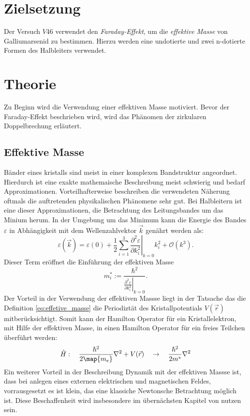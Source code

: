 \setcounter{page}{1}
\section*{Zielsetzung}
Der Versuch $V46$ verwendet den \emph{Faraday-Effekt}, um die \emph{effektive Masse} von
Galliumarsenid zu bestimmen. Hierzu werden eine undotierte und zwei n-dotierte
Formen des Halbleiters verwendet.

\section{Theorie}
Zu Beginn wird die Verwendung einer effektiven Masse motiviert.
Bevor der Faraday-Effekt beschrieben wird, wird das Phänomen der zirkularen
Doppelbrechung erläutert.

\subsection{Effektive Masse}\label{sec:effektive_masse}
 Bänder eines kristalls sind meist in einer komplexen Bandstruktur angeordnet.
Hierdurch ist eine exakte mathemaische Beschreibung meist schwierig und bedarf
Approximationen. Vorteilhafterweise beschreiben die verwendeten Näherung oftmals
die auftretenden physikalischen Phänomene sehr gut. Bei Halbleitern ist eine
dieser Approximationen, die Betrachtung des Leitungsbandes um das Minium herum.
In der Umgebung um das Minimum kann die Energie des Bandes $\varepsilon$
in Abhängigkeit mit dem Wellenzahlvektor $\vec{k}$ genährt werden als:
\begin{equation}
  \label{eq:gleichung_energie}
  \varepsilon(\vec{k})=\varepsilon(0) + \frac{1}{2}\sum_{i=1}^3 \left.\frac{\partial^2 \varepsilon}{\partial k_i^2}\right|_{k=0}k_i^2 + \mathcal{O}(k^3).
\end{equation}
Dieser Term eröffnet die Einführung der effektiven Masse
\begin{equation}
  \label{eq:effetive_masse}
  m^{*}_i := \frac{\hbar^2}{\left.\frac{\partial^2 \varepsilon}{\partial k_i^2}\right|_{k=0}}.
\end{equation}
Der Vorteil in der Verwendung der effektiven Massse liegt in der Tatsache das
die Definition \eqref{eq:effetive_masse} die Periodiztät des  Kristallpotentials
$V(\vec{r})$ mitberücksichtigt. Somit kann der Hamilton Operator für ein Kristallelektron,
mit Hilfe der effektiven Masse, in einen Hamilton Operator für ein freies
Teilchen überführt werden:
\begin{equation*}
  \hat{H}:\quad \frac{\hbar^2}{2\map{m_e}}\nabla^2 + V(\vec{r}) \quad \rightarrow \quad   \frac{\hbar^2}{2m^*}\nabla^2
\end{equation*}
Ein weiterer Vorteil in der Beschreibung Dynamik mit der effektiven Massse ist,
dass bei anlegen eines externen elektrischen und magnetischen Feldes,
vorrausgesetzt es ist klein, das eine klassiche Newtonsche Betrachtung möglich ist.
Diese Beschaffenheit wird insbesondere im übernächsten Kapitel von nutzen sein.
